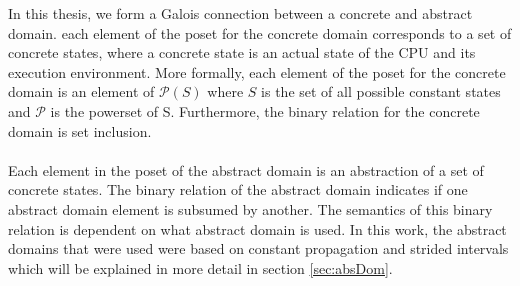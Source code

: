 \documentclass{kththesis}
\begin{document}
In this thesis, we form a Galois connection between a concrete and abstract domain. each element of the poset for the concrete domain corresponds to a set of concrete states, where a concrete state is an actual state of the CPU and its execution environment. More formally, each element of the poset for the concrete domain is an element of $\mathcal{P}(S)$ where $S$ is the set of all possible constant states and $\mathcal{P}$ is the powerset of S. Furthermore, the binary relation for the concrete domain is set inclusion. 
\\ \\
Each element in the poset of the abstract domain is an abstraction of a set of concrete states. The binary relation of the abstract domain indicates if one abstract domain element is subsumed by another. The semantics of this binary relation is dependent on what abstract domain is used. In this work, the abstract domains that were used were based on constant propagation and strided intervals which will be explained in more detail in section \ref{sec:absDom}.








\end{document}
